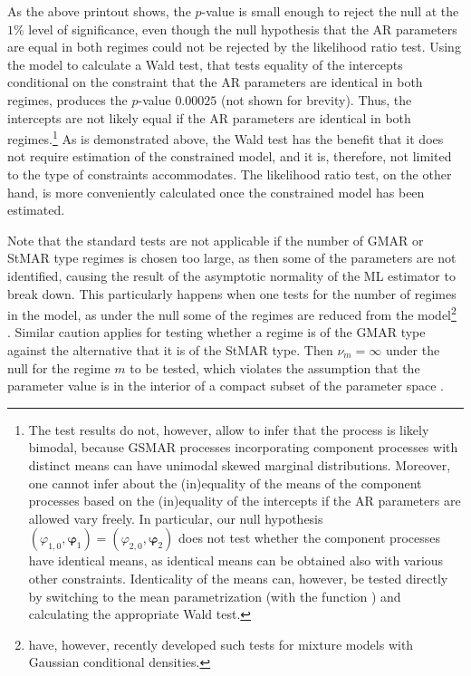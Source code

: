 \documentclass[nojss]{jss} %
\begin{document}
As the above printout shows, the $p$-value is small enough to reject the null at the $1\%$ level of significance, even though the null hypothesis that the AR parameters are equal in both regimes could not be rejected by the likelihood ratio test. Using the model  to calculate a Wald test, that tests equality of the intercepts conditional on the constraint that the AR parameters are identical in both regimes, produces the $p$-value $0.00025$ (not shown for brevity). Thus, the intercepts are not likely equal if the AR parameters are identical in both regimes.\footnote{The test results do not, however, allow to infer that the process is likely bimodal, because GSMAR processes incorporating component processes with distinct means can have unimodal skewed marginal distributions. Moreover, one cannot infer about the (in)equality of the means of the component processes based on the (in)equality of the intercepts if the AR parameters are allowed vary freely. In particular, our null hypothesis $(\varphi_{1,0},\boldsymbol{\varphi}_1) = (\varphi_{2,0},\boldsymbol{\varphi}_2)$ does not test whether the component processes have identical means, as identical means can be obtained also with various other constraints. Identicality of the means can, however, be tested directly by switching to the mean parametrization (with the function ) and calculating the appropriate Wald test.} As is demonstrated above, the Wald test has the benefit that it does not require estimation of the constrained model, and it is, therefore, not limited to the type of constraints  accommodates. The likelihood ratio test, on the other hand, is more conveniently calculated once the constrained model has been estimated.

Note that the standard tests are not applicable if the number of GMAR or StMAR type regimes is chosen too large, as then some of the parameters are not identified, causing the result of the asymptotic normality of the ML estimator to break down. This particularly happens when one tests for the number of regimes in the model, as under the null some of the regimes are reduced from the model\footnote{\cite{Meitz+Saikkonen:2021} have, however, recently developed such tests for mixture models with Gaussian conditional densities.} \citep[see the related discussion in][Section 3.3.2]{Kalliovirta+Meitz+Saikkonen:2015}. Similar caution applies for testing whether a regime is of the GMAR type against the alternative that it is of the StMAR type. Then $\nu_m = \infty$ under the null for the regime $m$ to be tested, which violates the assumption that the parameter value is in the interior of a compact subset of the parameter space \citep[see][Theorem 2 and Assumption 1]{Virolainen:2020}.
\end{document}
